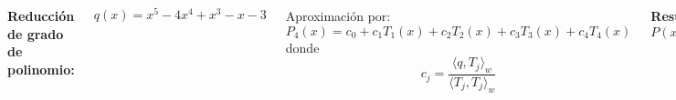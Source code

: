 \documentclass[9pt, aspectratio=169]{beamer}
\begin{document}
\begin{frame}
\begin{columns}[c]
\cx
\textbf{Reducción de grado de polinomio:}

\[ q(x) = x^5 - 4 x^4 + x^3 - x - 3 \]

Aproximación por:
\[ P_4(x) = c_0 + c_1 T_1(x) + c_2 T_2(x) + c_3 T_3(x) + c_4 T_4(x) \]
donde
\[ c_j = \frac{\langle q, T_j \rangle_w}{\langle T_j, T_j \rangle_w} \] \pause

\textbf{Resultado:} ver \texttt{code/plot-07.py}.
\[ P(x) = - 4.0 x^4 + 2.25 x^3 - 1.31 x - 3.0 \]

\cx
\begin{center}
    \includegraphics[height=1.0\textheight]{figs/fig-07.pdf}
\end{center}


\end{columns}
\end{frame}
\end{document}
